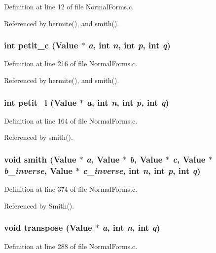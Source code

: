 Definition at line 12 of file Normal\-Forms.c.

Referenced by hermite(), and smith().

\subsubsection{\setlength{\rightskip}{0pt plus 5cm}int petit\_\-c (Value $\ast$ {\em a}, int {\em n}, int {\em p}, int {\em q})\hspace{0.3cm}{\tt  [static]}}\label{NormalForms_8c_a7}




Definition at line 216 of file Normal\-Forms.c.

Referenced by hermite(), and smith().

\subsubsection{\setlength{\rightskip}{0pt plus 5cm}int petit\_\-l (Value $\ast$ {\em a}, int {\em n}, int {\em p}, int {\em q})\hspace{0.3cm}{\tt  [static]}}\label{NormalForms_8c_a6}




Definition at line 164 of file Normal\-Forms.c.

Referenced by smith().

\subsubsection{\setlength{\rightskip}{0pt plus 5cm}void smith (Value $\ast$ {\em a}, Value $\ast$ {\em b}, Value $\ast$ {\em c}, Value $\ast$ {\em b\_\-inverse}, Value $\ast$ {\em c\_\-inverse}, int {\em n}, int {\em p}, int {\em q})\hspace{0.3cm}{\tt  [static]}}\label{NormalForms_8c_a11}




Definition at line 374 of file Normal\-Forms.c.

Referenced by Smith().

\subsubsection{\setlength{\rightskip}{0pt plus 5cm}void transpose (Value $\ast$ {\em a}, int {\em n}, int {\em q})\hspace{0.3cm}{\tt  [static]}}\label{NormalForms_8c_a9}




Definition at line 288 of file Normal\-Forms.c.